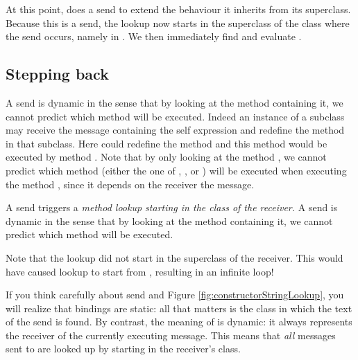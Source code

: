 \documentclass[10pt,twoside,english]{_support/latex/sbabook/sbabook}
\begin{document}
At this point,  does a  send to extend
the  behaviour it inherits from its superclass. Because this is
a  send, the lookup now starts in the superclass of the class where the
 send occurs, namely in . We then immediately find and
evaluate .
\subsection{Stepping back}
A  send is dynamic in the sense that by looking at the method containing
it, we cannot predict which method will be executed. Indeed an instance of a
subclass may receive the message containing the self expression and redefine the
method in that subclass. Here  could redefine the method
 and this method would be executed by method
. Note that by only looking at the method
, we cannot predict which  method (either
the one of , , or ) will be executed
when executing the method , since it depends on the
receiver the  message.

\begin{important}
A  send triggers a \textit{method lookup starting in the class of the receiver.} A  send is dynamic in the sense that by looking at the method containing it, we cannot predict which method will be executed.
\end{important}

Note that the  lookup did not start in the superclass of the receiver.
This would have caused lookup to start from , resulting in an
infinite loop!

If you think carefully about  send and Figure
\ref{fig:constructorStringLookup}, you will realize that  bindings are
static: all that matters is the class in which the text of the  send is
found. By contrast, the meaning of  is dynamic: it always represents the
receiver of the currently executing message. This means that \textit{all} messages
sent to  are looked up by starting in the receiver's class.
\end{document}
